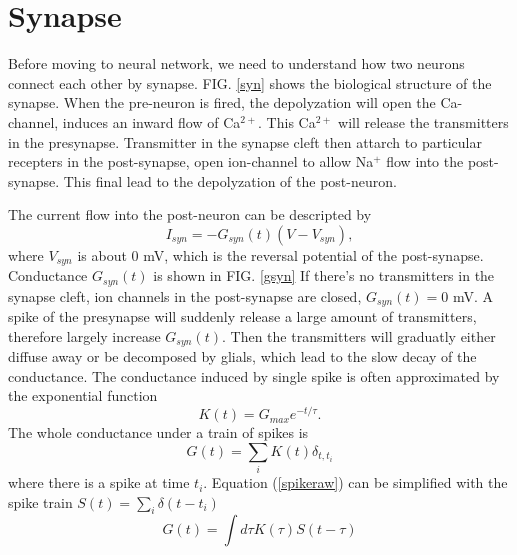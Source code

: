 \documentclass[11pt]{article}
\begin{document}
\section{Synapse}
Before moving to neural network, we need to understand how two neurons connect
each other by synapse. FIG. \ref{syn} shows the biological structure of the
synapse. When the pre-neuron is fired, the depolyzation will open the
Ca-channel, induces an inward flow of Ca$^{2+}$. This Ca$^{2+}$ will release the
transmitters in the presynapse. Transmitter in the synapse cleft then attarch to
particular recepters in the post-synapse, open ion-channel to allow Na$^+$ flow
into the post-synapse. This final lead to the depolyzation of the post-neuron.

The current flow into the post-neuron can be descripted by
\begin{equation}
  I_{syn} = - G_{syn}(t) (V - V_{syn}),
  \label{isyn}
\end{equation}
where $V_{syn}$ is about $0$ mV, which is the reversal potential of the
post-synapse. Conductance $G_{syn}(t)$ is shown in FIG. \ref{gsyn} If there's no
transmitters in the synapse cleft, ion channels in the post-synapse are closed,
$G_{syn}(t) = 0$ mV.
A spike of the presynapse will suddenly release a large
amount of transmitters, therefore largely increase
$G_{syn}(t)$. Then the transmitters will graduatly either diffuse away or be
decomposed by glials, which lead to the slow decay of the conductance.
The conductance induced by single spike is often approximated by the exponential
function
\begin{equation}
  K(t) = G_{max} e^{-t / \tau}.
\end{equation}
The whole conductance under a train of spikes is
\begin{equation}
  G(t) = \sum_iK(t) \delta_{t,t_i}
  \label{spikeraw}
\end{equation}
where there is a spike at time $t_i$. Equation (\ref{spikeraw}) can be
simplified with the spike train $S(t) = \sum_i\delta(t - t_i)$
\begin{equation}
  G(t) = \int{d\tau}K(\tau)S(t - \tau)
\end{equation}
\end{document}
